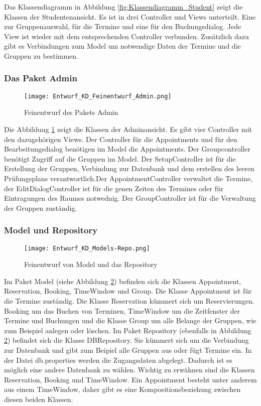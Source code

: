 \documentclass[a4paper,10pt]{article}
\begin{document}
Das Klassendiagramm in Abbildung \ref{fig:Klassendiagramm_Student} zeigt die Klassen der Studentenansicht. Es ist in drei Controller und Views unterteilt. Eine zur Gruppenauswahl, für die Termine und eine für den Buchungsdialog.
 Jede View ist wieder mit dem entsprechenden Controller verbunden. Zusätzlich dazu gibt es Verbindungen zum Model um notwendige Daten der Termine und die Gruppen zu bestimmen.
 
 \subsubsection{Das Paket Admin}
 \begin{figure}
  \texttt{[image: Entwurf\_KD\_Feinentwurf\_Admin.png]}
  \label{fig:Klassendiagramm_Admin}
  \caption{Feinentwurf des Pakets Admin}
 \end{figure} 

 Die Abbildung \ref{fig:Klassendiagramm_Admin} zeigt die Klassen der Adminansicht. Es gibt vier Controller mit den dazugehörigen Views. Der Controller für die Appointments und für den Bearbeitungsdialog benötigen im Model die Appointments. Der Groupcontroller benötigt Zugriff auf die Gruppen im Model.
 Der SetupController ist f\"ur die Erstellung der Gruppen, Verbindung zur Datenbank und dem erstellen des leeren Pr\"ufungsplans verantwortlich.Der AppointmentController verwaltet die Termine, der EditDialogController ist f\"ur die genen Zeiten des Termines oder f\"ur Eintragungen des Raumes notwednig.
 Der GroupController ist f\"ur die Verwaltung der Gruppen zust\"andig.
 \subsubsection{Model und Repository}
 
 \begin{figure}
  \texttt{[image: Entwurf\_KD\_Models-Repo.png]}
  \label{fig:Klassendiagramm_Models-Repo}
\caption{Feinentwurf von Model und das Repository}
 \end{figure} 

Im Paket Model (siehe Abbildung \ref{fig:Klassendiagramm_Models-Repo}) befinden sich die Klassen Appointment, Reservation, Booking, TimeWindow und Group. Die Klasse Appointment ist für die Termine zuständig. Die Klasse Reservation kümmert sich um Reservierungen. Booking um das Buchen von Terminen, TimeWindow um die Zeitfenster der Termine und Buchungen und die Klasse Group um alle Belange der Gruppen, wie zum Beispiel anlegen oder löschen.
Im Paket Repository (ebenfalls in Abbildung \ref{fig:Klassendiagramm_Models-Repo}) befindet sich die Klasse DBRepository. Sie kümmert sich um die Verbindung zur Datenbank und gibt zum Beipiel alle Gruppen aus oder fügt Termine ein.
In der Datei db.properties werden die Zugangsdaten abgelegt. Dadurch ist es m\"oglich eine andere Datenbank zu w\"ahlen.
Wichtig zu erw\"ahnen sind die Klassen Reservation, Booking und TimeWindow. Ein Appointment besteht unter anderem aus einem TimeWindow, daher gibt es eine Kompositionsbeziehung zwischen diesen beiden Klassen.
\end{document}
